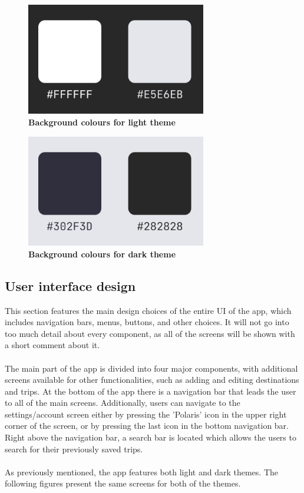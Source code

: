 \begin{figure}[!htb]
\centering
\includegraphics[width=0.7\textwidth]{../Images/UI/BackgroundLight.png}
\caption{\label{fig:dbapiuser}\textbf{Background colours for light theme}}
\end{figure} 

\begin{figure}[!htb]
\centering
\includegraphics[width=0.7\textwidth]{../Images/UI/BackgroundDark.png}
\caption{\label{fig:dbapiuser}\textbf{Background colours for dark theme}}
\end{figure} 
\newpage

\subsection{User interface design}

\hspace{\parindent}This section features the main design choices of the entire UI of the app, which includes navigation bars, menus, buttons, and other choices. It will not go into too much detail about every component, as all of the screens will be shown with a short comment about it. \\ \\
The main part of the app is divided into four major components, with additional screens available for other functionalities, such as adding and editing destinations and trips. At the bottom of the app there is a navigation bar that leads the user to all of the main screens. Additionally, users can navigate to the settings/account screen either by pressing the 'Polaris' icon in the upper right corner of the screen, or by pressing the last icon in the bottom navigation bar. Right above the navigation bar, a search bar is located which allows the users to search for their previously saved trips.\\ \\
As previously mentioned, the app features both light and dark themes. The following figures present the same screens for both of the themes.\\


